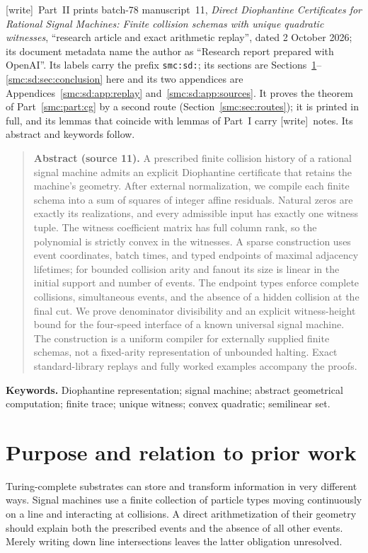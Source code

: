 \documentclass[11pt,letterpaper]{article}
\numberwithin{equation}{section}
\theoremstyle{definition}
\theoremstyle{remark}
\newcommand{\wtag}{\textup{[write]}}
\begin{document}
\noindent\wtag\ Part~II prints batch-78 manuscript~11, \emph{Direct Diophantine Certificates for Rational Signal Machines: Finite collision schemas with unique quadratic witnesses}, ``research article and exact arithmetic replay'', dated 2 October 2026; its document metadata name the author as ``Research report prepared with OpenAI''. Its labels carry the prefix \texttt{smc:sd:}; its sections are Sections~\ref{smc:sd:sec:purpose}--\ref{smc:sd:sec:conclusion} here and its two appendices are Appendices~\ref{smc:sd:app:replay} and~\ref{smc:sd:app:sources}. It proves the theorem of Part~\ref{smc:part:cg} by a second route (Section~\ref{smc:sec:routes}); it is printed in full, and its lemmas that coincide with lemmas of Part~I carry \wtag\ notes. Its abstract and keywords follow.
\begin{quote}\small
\textbf{Abstract (source 11).} A prescribed finite collision history of a rational signal machine admits an explicit Diophantine certificate that retains the machine's geometry. After external normalization, we compile each finite schema into a sum of squares of integer affine residuals. Natural zeros are exactly its realizations, and every admissible input has exactly one witness tuple. The witness coefficient matrix has full column rank, so the polynomial is strictly convex in the witnesses. A sparse construction uses event coordinates, batch times, and typed endpoints of maximal adjacency lifetimes; for bounded collision arity and fanout its size is linear in the initial support and number of events. The endpoint types enforce complete collisions, simultaneous events, and the absence of a hidden collision at the final cut. We prove denominator divisibility and an explicit witness-height bound for the four-speed interface of a known universal signal machine. The construction is a uniform compiler for externally supplied finite schemas, not a fixed-arity representation of unbounded halting. Exact standard-library replays and fully worked examples accompany the proofs.
\end{quote}

\noindent\textbf{Keywords.} Diophantine representation; signal machine; abstract geometrical computation; finite trace; unique witness; convex quadratic; semilinear set.

\section{Purpose and relation to prior work}\label{smc:sd:sec:purpose}
Turing-complete substrates can store and transform information in very different ways. Signal machines use a finite collection of particle types moving continuously on a line and interacting at collisions. A direct arithmetization of their geometry should explain both the prescribed events and the absence of all other events. Merely writing down line intersections leaves the latter obligation unresolved.
\end{document}

